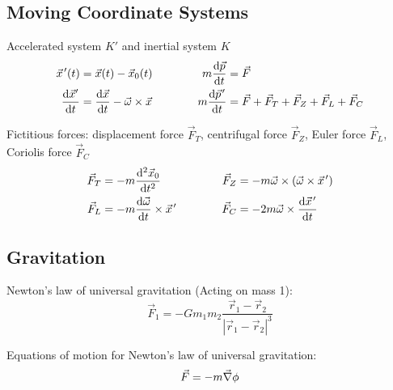 	\subsection{Moving Coordinate Systems}%
		\noindent
		Accelerated system $K'$ and inertial system $K$%
		\begin{equation}
			\begin{aligned}
				\pvec{x}'(t) &= \vec{x}(t)-\vec{x}_0(t) &\hspace{30pt}
				m\tder{\vec{p}}{t} &= \vec{F} \\
				\tder{\vec{x}'}{t} &= \tder{\vec{x}}{t}-\vec{\omega}\times\vec{x} &\hspace{30pt}
				m\tder{\pvec{p}'}{t} &= \vec{F} + \vec{F}_T + \vec{F}_Z + \vec{F}_L + \vec{F}_C \\
			\end{aligned}
		\end{equation}

		\noindent
		Fictitious forces: displacement force $\vec{F}_T$, centrifugal force $\vec{F}_Z$, Euler force $\vec{F}_L$, Coriolis force $\vec{F}_C$
		\begin{equation}
			\begin{aligned}
				\vec{F}_T &= -m\frac{\dd^2 \vec{x}_0}{\dd t^2} &\hspace{30pt}
				\vec{F}_Z &= -m\vec{\omega}\times\Br{\vec{\omega}\times\pvec{x}'} \\
				\vec{F}_L &= -m\tder{\vec{\omega}}{t}\times\pvec{x}' &\hspace{30pt}
				\vec{F}_C &= -2m\vec{\omega}\times\tder{\pvec{x}'}{t} \\
			\end{aligned}
		\end{equation}


	\subsection{Gravitation}
		\noindent
		Newton's law of universal gravitation (Acting on mass 1):
		\begin{equation}
			\vec{F}_1 = - G m_1 m_2 \frac{\vec{r}_1-\vec{r}_2}{\left|\vec{r}_1-\vec{r}_2\right|^3}
		\end{equation}

		\noindent
		Equations of motion for Newton's law of universal gravitation:
		\begin{equation}
			\vec{F}=-m\vec{\nabla}\phi
		\end{equation}

